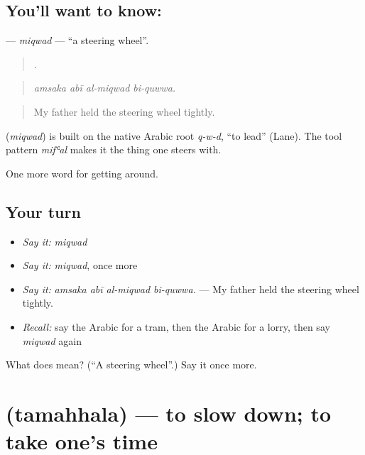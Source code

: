 \subsection*{You'll want to know: }
\textbf{} — \emph{miqwad} — \textquotedblleft{}a steering wheel\textquotedblright{}.

\begin{quote}
   .
\end{quote}

\begin{quote}
\emph{amsaka abī al-miqwad bi-quwwa.}
\end{quote}

\begin{quote}
My father held the steering wheel tightly.
\end{quote}

\begin{cousinweb}
\textbf{} (\emph{miqwad}) is built on the native Arabic root \emph{q-w-d}, \textquotedblleft{}to lead\textquotedblright{} (Lane). The tool pattern \emph{mifʿal} makes it the thing one steers with.
\end{cousinweb}

\begin{grammarlens}[title={What you've built}]
One more word for getting around.
\end{grammarlens}

\subsection*{Your turn}
\begin{itemize}
\raggedright
  \item \emph{Say it:} \emph{miqwad}
  \item \emph{Say it:} \emph{miqwad}, once more
  \item \emph{Say it:} \emph{amsaka abī al-miqwad bi-quwwa.} — My father held the steering wheel tightly.
  \item \emph{Recall:} say the Arabic for a tram, then the Arabic for a lorry, then say \emph{miqwad} again
\end{itemize}

\begin{tcolorbox}[breakable,colback=teal!4,colframe=teal!35!black,title={Before you move on}]
What does  mean? (\textquotedblleft{}A steering wheel\textquotedblright{}.) Say it once more.
\end{tcolorbox}
\section[\texorpdfstring{\ar{تمهل} (tamahhala)}{تمهل (tamahhala)}]{ (tamahhala) — to slow down; to take one's time}

